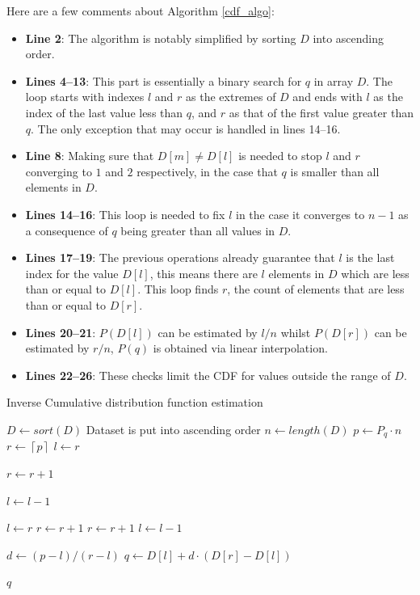 \documentclass[10pt,final]{siamltex}
\begin{document}
Here are a few comments about Algorithm \ref{cdf_algo}:
\begin{itemize}
  \item \textbf{Line 2}: The algorithm is notably simplified by sorting $D$ into ascending order.
  \item \textbf{Lines 4--13}: This part is essentially a binary search for $q$ in array $D$. The loop starts with indexes $l$ and $r$ as the extremes of $D$ and ends with $l$ as the index of the last value less than $q$, and $r$ as that of the first value greater than $q$. The only exception that may occur is handled in lines 14--16.
  \item \textbf{Line 8}: Making sure that $D[m]\neq D[l]$ is needed to stop $l$ and $r$ converging to $1$ and $2$ respectively, in the case that $q$ is smaller than all elements in $D$.
  \item \textbf{Lines 14--16}: This loop is needed to fix $l$ in the case it converges to $n-1$ as a consequence of $q$ being greater than all values in $D$.
  \item \textbf{Lines 17--19}: The previous operations already guarantee that $l$ is the last index for the value $D[l]$, this means there are $l$ elements in $D$ which are less than or equal to $D[l]$. This loop finds $r$, the count of elements that are less than or equal to $D[r]$.
  \item \textbf{Lines 20--21}: $P(D[l])$ can be estimated by $l/n$ whilst $P(D[r])$ can be estimated by $r/n$, $P(q)$ is obtained via linear interpolation.
  \item \textbf{Lines 22--26}: These checks limit the CDF for values outside the range of $D$.
\end{itemize}
%

\begin{algorithm}
  \caption{Inverse Cumulative distribution function estimation}
  \label{invcdf_algo}
  \begin{algorithmic}[1]
    \State $D \gets sort(D)$
    \Comment Dataset is put into ascending order
    \State $n \gets length(D)$
    \State $p \gets P_q \cdot n$
    \State $r \gets  \left \lceil{p}\right \rceil$
    \EndIf
    \State $l \gets r$

    \State $ r \gets r + 1$
    \EndWhile

    \State $l \gets l - 1$
    \EndWhile

    \State $l \gets r$
    \State $r \gets r+1$
    \State $r \gets r + 1$
    \EndWhile
    \Else
    \State $ l \gets l - 1$
    \EndIf

    \State $d \gets (p-l)/(r-l) $
    \State $q \gets D[l] + d \cdot (D[r]-D[l])$

    \State \Return $q$
    \EndFunction
  \end{algorithmic}
\end{algorithm}
\end{document}
